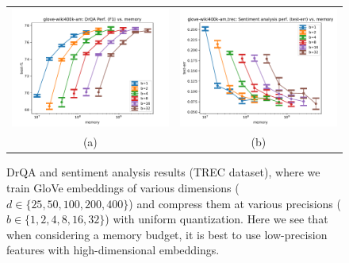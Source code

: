 \begin{figure}
	\centering
	\begin{small}
		\begin{tabular}{@{\hskip -0.0in}c@{\hskip -0.0in}c@{\hskip -0.0in}}
			\includegraphics[width=0.4\linewidth]{figures/glove-wiki400k-am_drqa_vs_compression.pdf} &
			\includegraphics[width=0.4\linewidth]{figures/glove-wiki400k-am_trec_test-err_vs_compression.pdf} \\
			\;\;\;\;\;(a) & \;\;\;\;\;\;(b) 
		\end{tabular}
	\end{small}
	\caption{DrQA and sentiment analysis results (TREC dataset), where we train GloVe embeddings of various dimensions ($d\in\{25,50,100,200,400\}$) and compress them at various precisions ($b \in \{1,2,4,8,16,32\}$) with uniform quantization.  Here we see that when considering a memory budget, it is best to use low-precision features with high-dimensional embeddings.}
	\label{fig:drqa_sent_dimVsPrec}
\end{figure}


